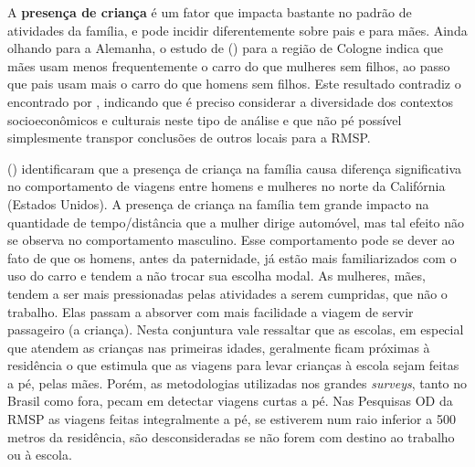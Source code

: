 A \textbf{presença de criança} é um fator que impacta bastante no padrão de atividades da família, e pode incidir diferentemente sobre pais e para mães. Ainda olhando para a Alemanha, o estudo de  (\citeyear{BEST2005}) para a região de Cologne indica que mães usam menos frequentemente o carro do que mulheres sem filhos, ao passo que pais usam mais o carro do que homens sem filhos.
Este resultado contradiz o encontrado por , indicando que é preciso considerar a diversidade dos contextos socioeconômicos e culturais neste tipo de análise e que não pé possível simplesmente transpor conclusões de outros locais para a RMSP.

 (\citeyear{GODDARD2006}) identificaram que a presença de criança na família causa diferença significativa no comportamento de viagens entre homens e mulheres no norte da Califórnia (Estados Unidos). A presença de criança na família tem grande impacto na quantidade de tempo/distância que a mulher dirige automóvel, mas tal efeito não se observa no comportamento masculino. 
Esse comportamento pode se dever ao fato de que os homens, antes da paternidade, já estão mais familiarizados com o uso do carro e tendem a não trocar sua escolha modal. 
As mulheres, mães, tendem a ser mais pressionadas pelas atividades a serem cumpridas, que não o trabalho. Elas passam a absorver com mais facilidade a viagem de servir passageiro (a criança). Nesta conjuntura vale ressaltar que as escolas, em especial que atendem as crianças nas primeiras idades, geralmente ficam próximas à residência o que estimula que as viagens para levar crianças à escola sejam feitas a pé, pelas mães. Porém, as metodologias utilizadas nos grandes \emph{surveys}, tanto no Brasil como fora, pecam em detectar viagens curtas a pé. Nas Pesquisas OD da RMSP as viagens feitas integralmente a pé, se estiverem num raio inferior a 500 metros da residência, são desconsideradas se não forem com destino ao trabalho ou à escola.





